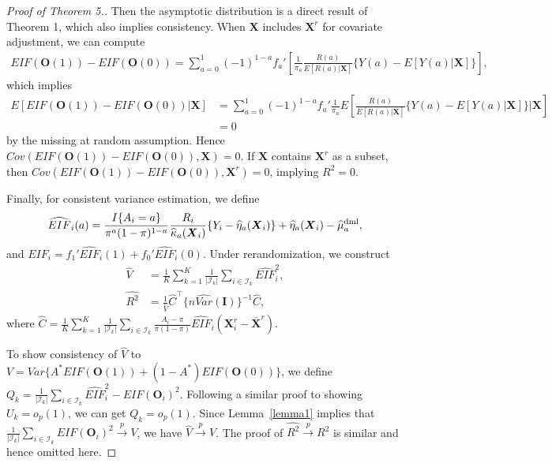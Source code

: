 \documentclass[12pt]{article}
\newcommand{\bX}{\boldsymbol{X}}
\newcommand{\bO}{\boldsymbol{O}}
\newcommand{\bI}{\boldsymbol{I}}
\begin{document}
\begin{proof}[Proof of Theorem 5.]
Then the asymptotic distribution is a direct result of Theorem 1, which also implies consistency. When $\bX$ includes $\bX^r$ for covariate adjustment, we can compute
\begin{align*}
    EIF(\bO(1)) - EIF(\bO(0)) = \sum_{a=0}^1 (-1)^{1-a} f_a'\left[ \frac{1}{\pi_a} \frac{R(a)}{E[R(a)|\bX]}\{Y(a) - E[Y(a)|\bX]\} \right],
\end{align*}
which implies
\begin{align*}
    E\left[EIF(\bO(1)) - EIF(\bO(0))|\bX\right] &= \sum_{a=0}^1 (-1)^{1-a} f_a' \frac{1}{\pi_a} E\left[\frac{R(a)}{E[R(a)|\bX]}\{Y(a) - E[Y(a)|\bX]\}\bigg|\bX\right] \\
    &= 0
\end{align*}
by the missing at random assumption. Hence $Cov(EIF(\bO(1)) - EIF(\bO(0)), \bX) = 0$. If $\bX$ contains $\bX^r$ as a subset, then $Cov(EIF(\bO(1)) - EIF(\bO(0)), \bX^r) = 0$, implying $R^2=0$.


Finally, for consistent variance estimation, we define
\begin{align*}
    \widehat{EIF}_i(a) = \frac{I\{A_i=a\}}{\pi^a(1-\pi)^{1-a}}\frac{R_i}{\widehat{\kappa}_a(\bX_i)}\{Y_i - \widehat{\eta}_a(\bX_i)\} + \widehat{\eta}_a(\bX_i)-\widehat{\mu}_a^{\textup{dml}},
\end{align*}
and $\widehat{EIF}_{i}= f_1' \widehat{EIF}_{i}(1)+ f_0'\widehat{EIF}_{i}(0)$. Under rerandomization, we construct
\begin{align}
    \widehat{V} &= \frac{1}{K}\sum_{k=1}^K \frac{1}{|\mathcal{I}_k|} \sum_{i \in \mathcal{I}_k} \widehat{EIF}_{i}^2, \label{Vhat: ml}\\
    \widehat{R^2} &= \frac{1}{\widehat{V}} \widehat{C}^\top \{n \widehat{Var}(\bI)\}^{-1} \widehat{C},\label{R2hat: ml}
\end{align}
where $\widehat{C} = \frac{1}{K}\sum_{k=1}^K \frac{1}{|\mathcal{I}_k|} \sum_{i \in \mathcal{I}_k} \frac{A_i-\pi}{\pi(1-\pi)} \widehat{EIF}_{i} (\bX_i^r - \overline{\bX}^r)$.

To show consistency of $\widehat{V}$ to $V = Var\{A^* EIF(\bO(1))+(1-A^*)EIF(\bO(0))\}$, we define $Q_k = \frac{1}{|\mathcal{I}_k|} \sum_{i \in \mathcal{I}_k} \widehat{EIF}_{i}^2 - EIF(\bO_i)^2$. Following a similar proof to showing $U_k = o_p(1)$, we can get $Q_k = o_p(1)$. Since Lemma~\ref{lemma1} implies that $\frac{1}{|\mathcal{I}_k|} \sum_{i \in \mathcal{I}_k} EIF(\bO_i)^2 \xrightarrow{p} V$, we have $\widehat{V} \xrightarrow{p} V$. The proof of $ \widehat{R^2} \xrightarrow{p} R^2$ is similar and hence omitted here.


\end{proof}
\end{document}
